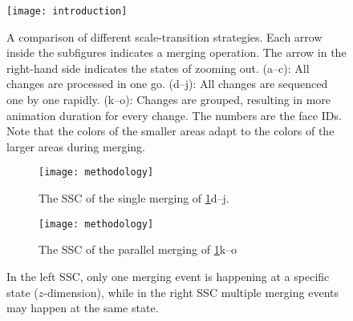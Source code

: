 \documentclass[]{interact}
\begin{document}



\begin{figure}[tb]
\centering
\texttt{[image: introduction]}
\caption{A comparison of different scale-transition strategies.
Each arrow inside the subfigures indicates a merging operation.
The arrow in the right-hand side indicates the states of zooming out.
%
(a--c): All changes are processed in one go.
(d--j): All changes are sequenced one by one rapidly.
(k--o): Changes are grouped, resulting in more animation duration for every change.
%
The numbers are the face IDs. 
Note that the colors of the smaller areas
adapt to the colors of the larger areas during merging.
}
\label{fig:intro}
\end{figure}



\begin{figure}
\centering
\begin{subfigure}[t]{0.48\textwidth}
\centering
\texttt{[image: methodology]}
\caption{The SSC of the single merging of \figs\ref{fig:intro}d--j.}
\end{subfigure}
\hfill
\begin{subfigure}[t]{0.48\textwidth}
\centering
\texttt{[image: methodology]}
\caption{The SSC of the parallel merging of \figs\ref{fig:intro}k--o}
\end{subfigure}
\caption{
In the left SSC, only one merging event is happening 
at a specific state ($z$-dimension), 
while in the right SSC multiple merging events may happen at the same state.
}
\label{fig:ssc}
\end{figure}


%
%
\end{document}
